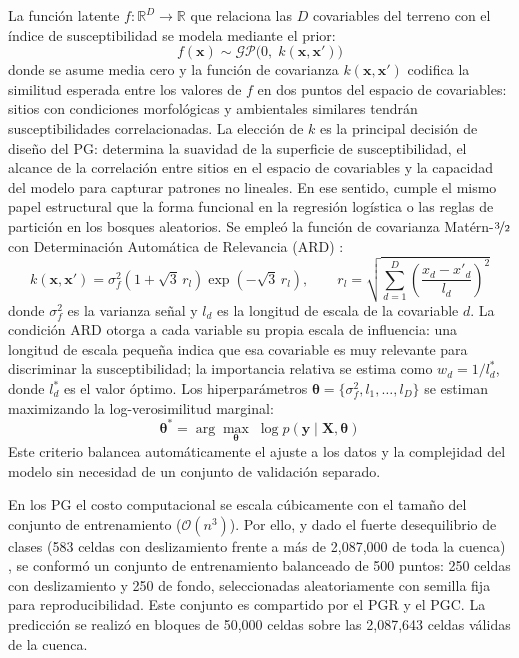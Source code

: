 \documentclass[letterpaper,11pt]{tec}
\begin{document}
{La función latente $f:\mathbb{R}^D\!\to\mathbb{R}$ que relaciona las $D$ covariables del terreno con el
índice de susceptibilidad se modela mediante el prior:
\begin{equation}
    f(\mathbf{x}) \sim \mathcal{GP}\!\bigl(0,\; k(\mathbf{x},\mathbf{x}')\bigr)
    \label{eq:gp_prior}
\end{equation}
donde se asume media cero y la función de covarianza $k(\mathbf{x},\mathbf{x}')$ codifica la similitud esperada entre
los valores de $f$ en dos puntos del espacio de covariables: sitios con condiciones morfológicas y ambientales
similares tendrán susceptibilidades correlacionadas. La elección de $k$ es la principal decisión de diseño del PG: 
determina la suavidad de la superficie de susceptibilidad, el alcance de la correlación
entre sitios en el espacio de covariables y la capacidad del modelo para capturar patrones no lineales.
En ese sentido, cumple el mismo papel estructural que la forma funcional en la regresión logística
o las reglas de partición en los bosques aleatorios.
Se empleó la función de covarianza Matérn-$\nicefrac{3}{2}$ con
Determinación Automática de Relevancia (ARD) \citep{Matern1960, Rasmussen2006}:
\begin{equation}
    k(\mathbf{x},\mathbf{x}') = \sigma_f^2\!\left(1 + \sqrt{3}\,r_l\right)\exp\!\left(-\sqrt{3}\,r_l\right),
    \qquad
    r_l = \sqrt{\sum_{d=1}^{D}\!\left(\frac{x_d - x'_d}{l_d}\right)^{\!2}}
    \label{eq:matern}
\end{equation}
donde $\sigma_f^2$ es la varianza señal y $l_d$ es la longitud de escala de la covariable $d$. La condición
ARD otorga a cada variable su propia escala de influencia: una longitud de escala pequeña indica que esa
covariable es muy relevante para discriminar la susceptibilidad; la importancia relativa se estima como
$w_d = 1/l_d^*$, donde $l_d^*$ es el valor óptimo. Los hiperparámetros
$\boldsymbol{\theta}=\{\sigma_f^2, l_1,\ldots,l_D\}$ se estiman maximizando la log-verosimilitud marginal:
\begin{equation}
    \boldsymbol{\theta}^* = \arg\max_{\boldsymbol{\theta}}\;\log p\!\left(\mathbf{y}\mid\mathbf{X},\boldsymbol{\theta}\right)
    \label{eq:mle}
\end{equation}
Este criterio balancea automáticamente el ajuste a los datos y la complejidad del modelo sin necesidad de un
conjunto de validación separado.

En los PG el costo computacional se escala cúbicamente con el tamaño del conjunto de entrenamiento ($\mathcal{O}(n^3)$).
Por ello, y dado el fuerte desequilibrio de clases (583 celdas con deslizamiento frente a más de
2{,}087{,}000 de toda la cuenca) \citep{Chawla2002, Heckmann2014}, se conformó un conjunto de entrenamiento
balanceado de 500 puntos: 250 celdas con deslizamiento y 250 de fondo, seleccionadas aleatoriamente
con semilla fija para reproducibilidad. Este conjunto es compartido por el PGR y el PGC. La predicción
se realizó en bloques de 50{,}000 celdas sobre las 2{,}087{,}643 celdas válidas de la cuenca.

}
\end{document}
